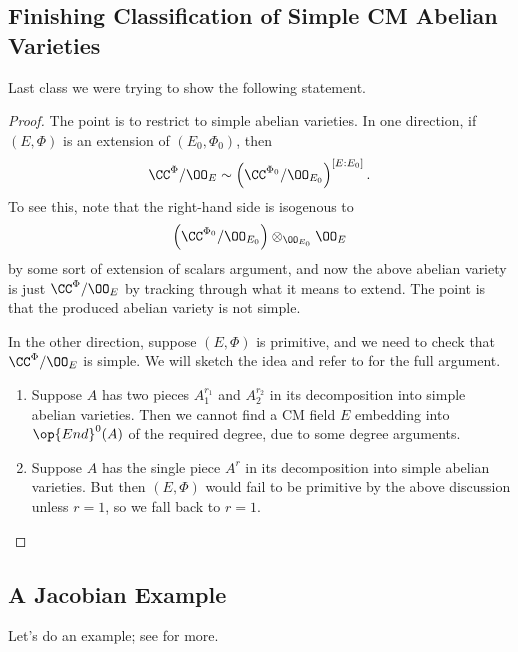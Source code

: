 \documentclass[../notes.tex]{subfiles}
\begin{document}
\subsection{Finishing Classification of Simple CM Abelian Varieties}
Last class we were trying to show the following statement.
\simplecmclassification*
\begin{proof}
	The point is to restrict  to simple abelian varieties. In one direction, if $(E,\Phi)$ is an extension of $(E_0,\Phi_0)$, then
	\[\CC^\Phi/\OO_E\sim\left(\CC^{\Phi_0}/\OO_{E_0}\right)^{[E:E_0]}.\]
	To see this, note that the right-hand side is isogenous to
	\[\left(\CC^{\Phi_0}/\OO_{E_0}\right)\otimes_{\OO_{E_0}}\OO_E\]
	by some sort of extension of scalars argument, and now the above abelian variety is just $\CC^\Phi/\OO_E$ by tracking through what it means to extend. The point is that the produced abelian variety is not simple.

	In the other direction, suppose $(E,\Phi)$ is primitive, and we need to check that $\CC^\Phi/\OO_E$ is simple. We will sketch the idea and refer to \cite[Proposition~3.6]{milne-cm} for the full argument.
	\begin{enumerate}
		\item Suppose $A$ has two pieces $A_1^{r_1}$ and $A_2^{r_2}$ in its decomposition into simple abelian varieties. Then we cannot find a CM field $E$ embedding into $\op{End}^0(A)$ of the required degree, due to some degree arguments.
		\item Suppose $A$ has the single piece $A^r$ in its decomposition into simple abelian varieties. But then $(E,\Phi)$ would fail to be primitive by the above discussion unless $r=1$, so we fall back to $r=1$.
		\qedhere
	\end{enumerate}
\end{proof}

\subsection{A Jacobian Example} \label{subsec:jac-cm}
Let's do an example; see \cite[Section~1.7]{lang-cm} for more.
\end{document}
